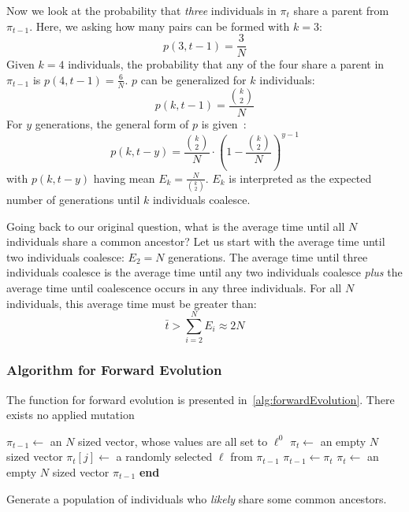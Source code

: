 Now we look at the probability that \emph{three} individuals in $\pi_t$ share a parent from $\pi_{t-1}$.
Here, we asking how many pairs can be formed with $k=3$:
\begin{equation}
    p(3, t-1) = \frac{3}{N}
\end{equation}
Given $k=4$ individuals, the probability that any of the four share a parent in $\pi_{t-1}$ is
$p(4, t-1) = \frac{6}{N}$.
$p$ can be generalized for $k$ individuals:
\begin{equation}
    p(k, t-1) = \frac{\binom{k}{2}}{N}
\end{equation}
For $y$ generations, the general form of $p$ is given~\cite{hudsonGeneGenealogiesCoalescent1990}:
\begin{equation}
    p(k, t-y) = \frac{\binom{k}{2}}{N} \cdot \left(1 - \frac{\binom{k}{2}}{N}\right)^{y-1}
\end{equation}
with $p(k, t-y)$ having mean $E_k = \frac{N}{\binom{k}{2}}$.
$E_k$ is interpreted as the expected number of generations until $k$ individuals coalesce.

Going back to our original question, what is the average time until all $N$ individuals share a common ancestor?
Let us start with the average time until two individuals coalesce: $E_2 = N$ generations.
The average time until three individuals coalesce is the average time until any two individuals coalesce \emph{plus} the
average time until coalescence occurs in any three individuals.
For all $N$ individuals, this average time must be greater than:
\begin{equation}
    \bar{t} > \sum_{i=2}^{N} E_i \approx 2N
\end{equation}

\subsubsection{Algorithm for Forward Evolution}
The function  for forward evolution is presented in~\autoref{alg:forwardEvolution}.
There exists no applied mutation

\begin{algorithm}[ht]
    \SetAlgoLined
    \DontPrintSemicolon
     {
        $\pi_{t-1} \gets $ an $N$ sized vector, whose values are all set to $\ell^0$ \;
        $\pi_t \gets $ an empty $N$ sized vector \;
         {
             {
                $\pi_t[j] \gets $ a randomly selected $\ell$ from $\pi_{t-1}$ \;
            }
            $\pi_{t-1} \gets \pi_t$ \;
            $\pi_t \gets$ an empty $N$ sized vector \;
        }
        \Return $\pi_{t-1}$ \;
    }
    \textbf{end} \;
    \caption{Generate a population of individuals who \emph{likely} share some common
    ancestors.}\label{alg:forwardEvolution}
\end{algorithm}

